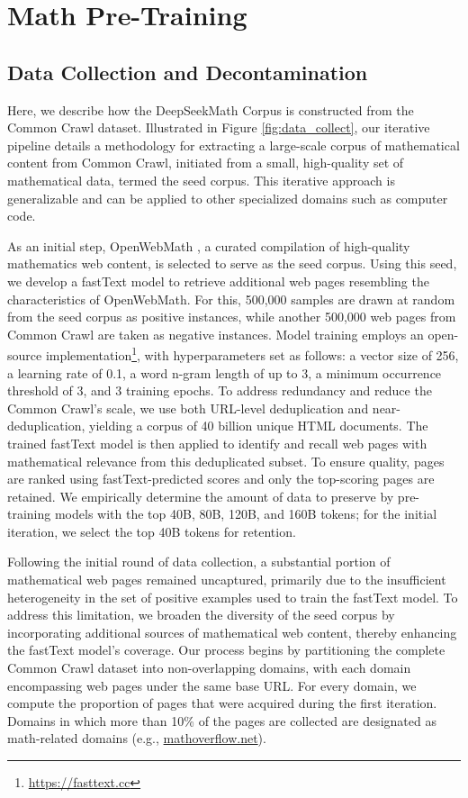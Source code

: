 \section{Math Pre-Training}

\subsection{Data Collection and Decontamination} 
Here, we describe how the DeepSeekMath Corpus is constructed from the Common Crawl dataset. Illustrated in Figure \ref{fig:data_collect}, our iterative pipeline details a methodology for extracting a large-scale corpus of mathematical content from Common Crawl, initiated from a small, high-quality set of mathematical data, termed the seed corpus. This iterative approach is generalizable and can be applied to other specialized domains such as computer code.

As an initial step, OpenWebMath \citep{openwebmath}, a curated compilation of high-quality mathematics web content, is selected to serve as the seed corpus. Using this seed, we develop a fastText model \citep{joulin2016fasttext} to retrieve additional web pages resembling the characteristics of OpenWebMath. For this, 500,000 samples are drawn at random from the seed corpus as positive instances, while another 500,000 web pages from Common Crawl are taken as negative instances. Model training employs an open-source implementation\footnote{\url{https://fasttext.cc}}, with hyperparameters set as follows: a vector size of 256, a learning rate of 0.1, a word n-gram length of up to 3, a minimum occurrence threshold of 3, and 3 training epochs. To address redundancy and reduce the Common Crawl’s scale, we use both URL-level deduplication and near-deduplication, yielding a corpus of 40 billion unique HTML documents. The trained fastText model is then applied to identify and recall web pages with mathematical relevance from this deduplicated subset. To ensure quality, pages are ranked using fastText-predicted scores and only the top-scoring pages are retained. We empirically determine the amount of data to preserve by pre-training models with the top 40B, 80B, 120B, and 160B tokens; for the initial iteration, we select the top 40B tokens for retention.

Following the initial round of data collection, a substantial portion of mathematical web pages remained uncaptured, primarily due to the insufficient heterogeneity in the set of positive examples used to train the fastText model. To address this limitation, we broaden the diversity of the seed corpus by incorporating additional sources of mathematical web content, thereby enhancing the fastText model’s coverage. Our process begins by partitioning the complete Common Crawl dataset into non-overlapping domains, with each domain encompassing web pages under the same base URL. For every domain, we compute the proportion of pages that were acquired during the first iteration. Domains in which more than 10\% of the pages are collected are designated as math-related domains (e.g., \url{mathoverflow.net}).

